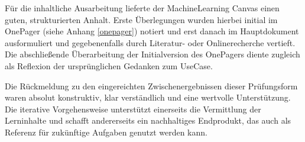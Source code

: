 Für die inhaltliche Ausarbeitung lieferte der MachineLearning Canvas einen guten, strukturierten Anhalt. Erste Überlegungen wurden hierbei initial im OnePager (siehe Anhang \ref{onepager}) notiert und erst danach im Hauptdokument ausformuliert und gegebenenfalls durch Literatur- oder Onlinerecherche vertieft. Die abschließende Überarbeitung der Initialversion des OnePagers diente zugleich als Reflexion der ursprünglichen Gedanken zum UseCase.

Die Rückmeldung zu den eingereichten Zwischenergebnissen dieser Prüfungsform waren absolut konstruktiv, klar verständlich und eine wertvolle Unterstützung. Die iterative Vorgehensweise unterstützt einerseits die Vermittlung der Lerninhalte und schafft andererseits ein nachhaltiges Endprodukt, das auch als Referenz für zukünftige Aufgaben genutzt werden kann. 


